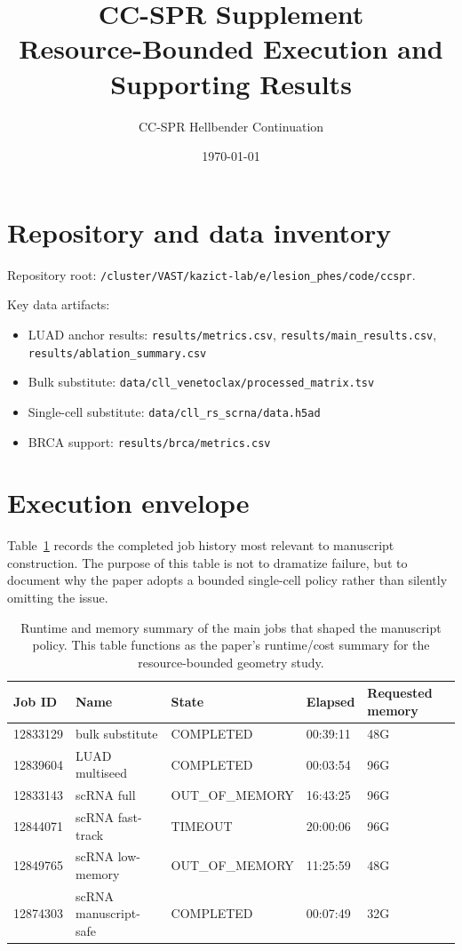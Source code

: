 \documentclass[11pt]{article}
\title{CC-SPR Supplement\\\large Resource-Bounded Execution and Supporting Results}
\author{CC-SPR Hellbender Continuation}
\date{\today}
\begin{document}
\maketitle

\section{Repository and data inventory}
Repository root: \texttt{/cluster/VAST/kazict-lab/e/lesion\_phes/code/ccspr}.

Key data artifacts:
\begin{itemize}[leftmargin=1.5em]
\item LUAD anchor results: \texttt{results/metrics.csv}, \texttt{results/main\_results.csv}, \texttt{results/ablation\_summary.csv}
\item Bulk substitute: \texttt{data/cll\_venetoclax/processed\_matrix.tsv}
\item Single-cell substitute: \texttt{data/cll\_rs\_scrna/data.h5ad}
\item BRCA support: \texttt{results/brca/metrics.csv}
\end{itemize}

\section{Execution envelope}
Table~\ref{tab:jobs} records the completed job history most relevant to manuscript construction. The purpose of this table is not to dramatize failure, but to document why the paper adopts a bounded single-cell policy rather than silently omitting the issue.

\begin{table}[h]
\centering
\small
\begin{tabular}{lllll}
\toprule
Job ID & Name & State & Elapsed & Requested memory \\
\midrule
12833129 & bulk substitute & COMPLETED & 00:39:11 & 48G \\
12839604 & LUAD multiseed & COMPLETED & 00:03:54 & 96G \\
12833143 & scRNA full & OUT\_OF\_MEMORY & 16:43:25 & 96G \\
12844071 & scRNA fast-track & TIMEOUT & 20:00:06 & 96G \\
12849765 & scRNA low-memory & OUT\_OF\_MEMORY & 11:25:59 & 48G \\
12874303 & scRNA manuscript-safe & COMPLETED & 00:07:49 & 32G \\
\bottomrule
\end{tabular}
\caption{Runtime and memory summary of the main jobs that shaped the manuscript policy. This table functions as the paper's runtime/cost summary for the resource-bounded geometry study.}
\label{tab:jobs}
\end{table}
\end{document}
